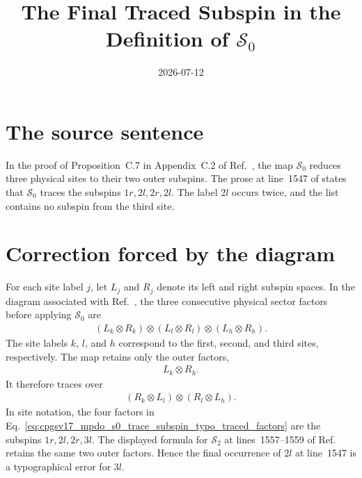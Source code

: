 \documentclass{article}
\title{The Final Traced Subspin in the Definition of $\mathcal S_0$}
\author{}
\date{2026-07-12}
\begin{document}
\maketitle
{}

\section{The source sentence}

In the proof of Proposition~C.7 in Appendix~C.2 of
Ref.~\cite{Cirac2016MPDO_arXiv}, the map $\mathcal S_0$ reduces three physical
sites to their two outer subspins. The prose at line~1547 of
 states that $\mathcal S_0$ traces
the subspins $1r,2l,2r,2l$. The label $2l$ occurs twice, and the list contains
no subspin from the third site.

\section{Correction forced by the diagram}

For each site label $j$, let $L_j$ and $R_j$ denote its left and right subspin
spaces. In the diagram
 associated with
Ref.~\cite{Cirac2016MPDO_arXiv}, the three consecutive physical sector factors
before applying $\mathcal S_0$ are
\begin{align}
    (L_k\otimes R_k)
        \otimes(L_l\otimes R_l)
        \otimes(L_h\otimes R_h).
    \label{eq:cpgsv17_mpdo_s0_trace_subspin_typo_three_site_factors}
\end{align}
The site labels $k$, $l$, and $h$ correspond to the first, second, and third
sites, respectively. The map retains only the outer factors,
\begin{align}
    L_k\otimes R_h.
    \label{eq:cpgsv17_mpdo_s0_trace_subspin_typo_retained_outer_factors}
\end{align}
It therefore traces over
\begin{align}
    (R_k\otimes L_l)
        \otimes(R_l\otimes L_h).
    \label{eq:cpgsv17_mpdo_s0_trace_subspin_typo_traced_factors}
\end{align}
In site notation, the four factors in
Eq.~\ref{eq:cpgsv17_mpdo_s0_trace_subspin_typo_traced_factors} are the
subspins $1r,2l,2r,3l$. The displayed formula for $\mathcal S_2$ at
lines~1557--1559 of Ref.~\cite{Cirac2016MPDO_arXiv} retains the same two outer
factors. Hence the final occurrence of $2l$ at line~1547 is a typographical
error for $3l$.
\end{document}
